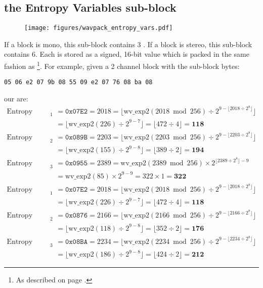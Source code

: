 \subsection{the Entropy Variables sub-block}
\begin{figure}[h]
\texttt{[image: figures/wavpack\_entropy\_vars.pdf]}
\end{figure}
\par
\noindent
If a block is mono, this sub-block contains 3 .
If a block is stereo, this sub-block contains 6.
Each is stored as a signed, 16-bit value which is packed in
the same fashion as \footnote{As described
on page \pageref{wavpack_decorr_samples}.}.
For example, given a 2 channel block with the sub-block bytes:
\begin{Verbatim}[frame=single]
05 06 e2 07 9b 08 55 09 e2 07 76 08 ba 08
\end{Verbatim}
our  are:
\begin{align*}
\text{Entropy Variable A}_1 &= \texttt{0x07E2} = 2018 = \lfloor \text{wv\_exp2}(2018 \bmod{256}) \div 2 ^ {9 - \lfloor 2018 \div 2 ^ 8 \rfloor} \rfloor \\
&= \lfloor \text{wv\_exp2}(226) \div 2 ^ {9 - 7} \rfloor
 = \lfloor 472 \div 4 \rfloor = \textbf{118} \\
\text{Entropy Variable A}_2 &= \texttt{0x089B} = 2203 = \lfloor \text{wv\_exp2}(2203 \bmod{256}) \div 2 ^ {9 - \lfloor 2203 \div 2 ^ 8 \rfloor} \rfloor \\
&= \lfloor \text{wv\_exp2}(155) \div 2 ^ {9 - 8} \rfloor
 = \lfloor 389 \div 2 \rfloor = \textbf{194} \\
\text{Entropy Variable A}_3 &= \texttt{0x0955} = 2389 = \text{wv\_exp2}(2389 \bmod{256}) \times 2 ^ {\lfloor 2389 \div 2 ^ 8 \rfloor - 9} \\
&= \text{wv\_exp2}(85) \times 2 ^ {9 - 9} = 322 \times 1 = \textbf{322} \\
\text{Entropy Variable B}_1 &= \texttt{0x07E2} = 2018 = \lfloor \text{wv\_exp2}(2018 \bmod{256}) \div 2 ^ {9 - \lfloor 2018 \div 2 ^ 8 \rfloor} \rfloor \\
&= \lfloor \text{wv\_exp2}(226) \div 2 ^ {9 - 7} \rfloor
 = \lfloor 472 \div 4 \rfloor = \textbf{118} \\
\text{Entropy Variable B}_2 &= \texttt{0x0876} = 2166 = \lfloor \text{wv\_exp2}(2166 \bmod{256}) \div 2 ^ {9 - \lfloor 2166 \div 2 ^ 8 \rfloor} \rfloor \\
&= \lfloor \text{wv\_exp2}(118) \div 2 ^ {9 - 8} \rfloor = \lfloor 352 \div 2 \rfloor = \textbf{176} \\
\text{Entropy Variable B}_3 &= \texttt{0x08BA} = 2234 = \lfloor \text{wv\_exp2}(2234 \bmod{256}) \div 2 ^ {9 - \lfloor 2234 \div 2 ^ 8 \rfloor} \rfloor \\
&= \lfloor \text{wv\_exp2}(186) \div 2 ^ {9 - 8} \rfloor
 = \lfloor 424 \div 2 \rfloor = \textbf{212}
\end{align*}

